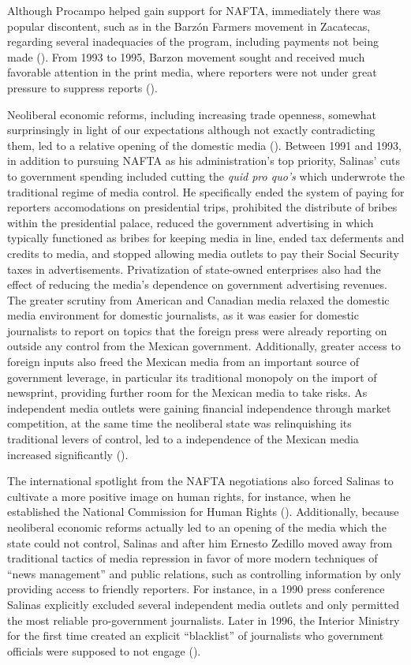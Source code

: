 \documentclass[12pt]{report}
\begin{document}
Although Procampo helped gain support for NAFTA, immediately there
was popular discontent, such as in the Barzón Farmers movement in
Zacatecas, regarding several inadequacies of the program, including
payments not being made (\citealt[173]{Williams:2001ux}). From 1993
to 1995, Barzon movement sought and received much favorable attention
in the print media, where reporters were not under great pressure
to suppress reports (\citealt[187]{Williams:2001ux}).

Neoliberal economic reforms, including increasing trade openness,
somewhat surprinsingly in light of our expectations although not exactly
contradicting them, led to a relative opening of the domestic media
(\citealt{lawson2002building}). Between 1991 and 1993, in addition
to pursuing NAFTA as his administration's top priority, Salinas' cuts
to government spending included cutting the \emph{quid pro quo's }which
underwrote the traditional regime of media control. He specifically
ended the system of paying for reporters accomodations on presidential
trips, prohibited the distribute of bribes within the presidential
palace, reduced the government advertising in which typically functioned
as bribes for keeping media in line, ended tax deferments and credits
to media, and stopped allowing media outlets to pay their Social Security
taxes in advertisements. Privatization of state-owned enterprises
also had the effect of reducing the media's dependence on government
advertising revenues. The greater scrutiny from American and Canadian
media relaxed the domestic media environment for domestic journalists,
as it was easier for domestic journalists to report on topics that
the foreign press were already reporting on outside any control from
the Mexican government. Additionally, greater access to foreign inputs
also freed the Mexican media from an important source of government
leverage, in particular its traditional monopoly on the import of
newsprint, providing further room for the Mexican media to take risks.
As independent media outlets were gaining financial independence through
market competition, at the same time the neoliberal state was relinquishing
its traditional levers of control, led to a independence of the Mexican
media increased significantly (\citealt[76, 89]{lawson2002building}).

The international spotlight from the NAFTA negotiations also forced
Salinas to cultivate a more positive image on human rights, for instance,
when he established the National Commission for Human Rights (\citealt[107]{Dominguez:2009wd}).
Additionally, because neoliberal economic reforms actually led to
an opening of the media which the state could not control, Salinas
and after him Ernesto Zedillo moved away from traditional tactics
of media repression in favor of more modern techniques of ``news
management'' and public relations, such as controlling information
by only providing access to friendly reporters. For instance, in a
1990 press conference Salinas explicitly excluded several independent
media outlets and only permitted the most reliable pro-government
journalists. Later in 1996, the Interior Ministry for the first time
created an explicit ``blacklist'' of journalists who government
officials were supposed to not engage (\citealt[39]{lawson2002building}).
\end{document}
